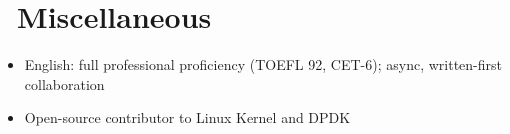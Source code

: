 \documentclass{resume}
\begin{document}
\section{\faGlobe\ Miscellaneous}
\begin{itemize}[parsep=0.5ex]
  \item English: full professional proficiency (TOEFL 92, CET-6); async, written-first collaboration
  \item Open-source contributor to Linux Kernel and DPDK
\end{itemize}
\end{document}
